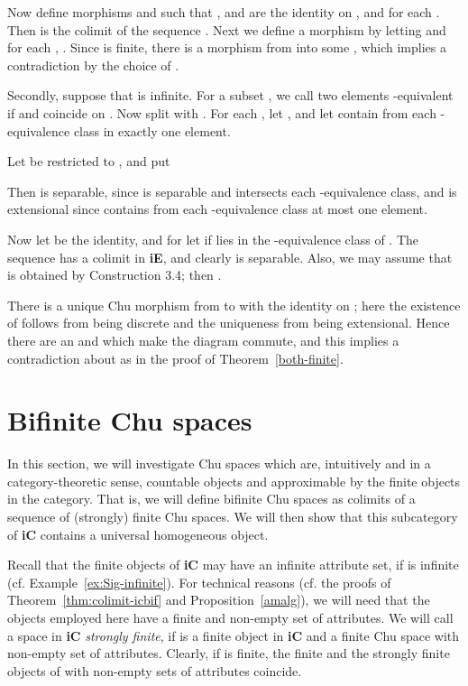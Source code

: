 \documentclass{LMCS}
\let\epf\endproof
\begin{document}
Now define morphisms 
and  such that ,  and  are the
identity on , and  for each . Then 
is the colimit of the sequence . 
Next we define a morphism  by letting
 and  for each , . 
Since  is finite, there is a morphism from 
into some , which implies a contradiction by the choice
of . 

Secondly, suppose that  is infinite. For a subset ,
we call two elements  -equivalent if  and
 coincide on .  Now split  with .  For each , let , and let  contain from each -equivalence class
in  exactly one element. 

Let    be    restricted to  , and put

Then    is separable, since    is separable and    intersects
each  -equivalence class, and    is extensional since  
contains from each  -equivalence class at most one element. 

Now let    be the identity, and for  
let   if   lies in the
-equivalence class of  . 
The sequence    has a colimit  
in  {\bf iE}, and clearly  is separable. Also, we may assume that    is
obtained by Construction 3.4; then  . 

There is a unique Chu morphism  from  to  with
 the identity on ; here the existence of 
follows from  being discrete and the uniqueness from 
being extensional.  Hence there are an  and  which make the diagram commute, and this implies a
contradiction about  as in the proof of
Theorem~\ref{both-finite}.  \epf

\section{Bifinite Chu spaces}

\noindent In this section, we will investigate Chu spaces which are,
intuitively and in a category-theoretic sense, countable objects and
approximable by the finite objects in the category. That is, we will
define bifinite Chu spaces as colimits of a sequence of (strongly)
finite Chu spaces. We will then show that this subcategory of
\textbf{iC} contains a universal homogeneous object.


Recall that the finite objects of \textbf{iC} may have an infinite
attribute set, if  is infinite (cf. Example~\ref{ex:Sig-infinite}). 
For technical reasons (cf. the proofs
of Theorem~\ref{thm:colimit-icbif} and Proposition~\ref{amalg}),
we will need that the objects employed here have a finite and
non-empty set of attributes. We will call a space  in
\textbf{iC} \emph{strongly finite}, if  is a finite object
in \textbf{iC} and a finite Chu space with non-empty set of
attributes. Clearly, if  is finite, the finite and the
strongly finite objects of  with non-empty sets of
attributes coincide. 
\end{document}
